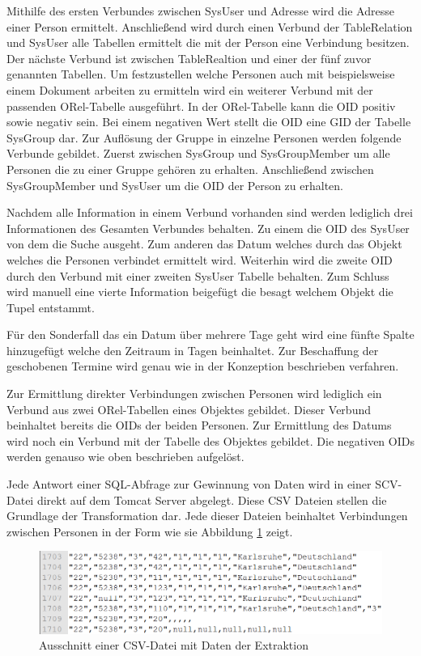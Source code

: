 Mithilfe des ersten Verbundes zwischen SysUser und Adresse wird die Adresse einer Person ermittelt. Anschließend wird durch einen Verbund der TableRelation und SysUser alle Tabellen ermittelt die mit der Person eine Verbindung besitzen. Der nächste Verbund ist zwischen TableRealtion und einer der fünf zuvor genannten Tabellen. Um festzustellen welche Personen auch mit beispielsweise einem Dokument arbeiten zu ermitteln wird ein weiterer Verbund mit der passenden ORel-Tabelle ausgeführt. In der ORel-Tabelle kann die OID positiv sowie negativ sein. Bei einem negativen Wert stellt die OID eine GID der Tabelle SysGroup dar. Zur Auflösung der Gruppe in einzelne Personen werden folgende Verbunde gebildet. Zuerst zwischen SysGroup und SysGroupMember um alle Personen die zu einer Gruppe gehören zu erhalten. Anschließend zwischen SysGroupMember und SysUser um die OID der Person zu erhalten. 

Nachdem alle Information in einem Verbund vorhanden sind werden lediglich drei Informationen des Gesamten Verbundes behalten. Zu einem die OID des SysUser von dem die Suche ausgeht. Zum anderen das Datum welches durch das Objekt welches die Personen verbindet ermittelt wird. Weiterhin wird die zweite OID durch den Verbund mit einer zweiten SysUser Tabelle behalten. Zum Schluss wird manuell eine vierte Information beigefügt die besagt welchem Objekt die Tupel entstammt. 

Für den Sonderfall das ein Datum über mehrere Tage geht wird eine fünfte Spalte hinzugefügt welche den Zeitraum in Tagen beinhaltet. Zur Beschaffung der geschobenen Termine wird genau wie in der Konzeption beschrieben verfahren.

Zur Ermittlung direkter Verbindungen zwischen Personen wird lediglich ein Verbund aus zwei ORel-Tabellen eines Objektes gebildet. Dieser Verbund beinhaltet bereits die OIDs der beiden Personen. Zur Ermittlung des Datums wird noch ein Verbund mit der Tabelle des Objektes gebildet. Die negativen OIDs werden genauso wie oben beschrieben aufgelöst. 

Jede Antwort einer SQL-Abfrage zur Gewinnung von Daten wird in einer SCV-Datei direkt auf dem Tomcat Server abgelegt. Diese CSV Dateien stellen die Grundlage der Transformation dar. Jede dieser Dateien beinhaltet Verbindungen zwischen Personen in der Form wie sie Abbildung \ref{fig:umsetzung_csv_datei} zeigt. 

\begin{figure}[htbp]
\begin{center}
\includegraphics[width=1.0\textwidth]{pics/umsetzung_csv_datei.png}
\caption{Ausschnitt einer CSV-Datei mit Daten der Extraktion}
\label{fig:umsetzung_csv_datei}
\end{center}
\end{figure}

